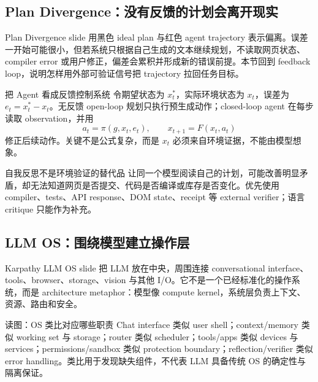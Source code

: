 \subsection{Plan Divergence：没有反馈的计划会离开现实}

Plan Divergence slide 用黑色 ideal plan 与红色 agent trajectory 表示偏离。误差一开始可能很小，但若系统只根据自己生成的文本继续规划，不读取网页状态、compiler error 或用户修正，偏差会累积并形成新的错误前提。本节回到 feedback loop，说明怎样用外部可验证信号把 trajectory 拉回任务目标。


\begin{importantbox}{把 Agent 看成反馈控制系统}
令期望状态为 $x_t^*$，实际环境状态为 $x_t$，误差为 $e_t=x_t^*-x_t$。无反馈 open-loop 规划只执行预生成动作；closed-loop agent 在每步读取 observation，并用
\[
a_t=\pi(g,x_t,e_t),\qquad x_{t+1}=F(x_t,a_t)
\]
修正后续动作。关键不是公式复杂，而是 $x_t$ 必须来自环境证据，不能由模型想象。
\end{importantbox}

\begin{warningbox}{自我反思不是环境验证的替代品}
让同一个模型阅读自己的计划，可能改善明显矛盾，却无法知道网页是否提交、代码是否编译或库存是否变化。优先使用 compiler、tests、API response、DOM state、receipt 等 external verifier；语言 critique 只能作为补充。
\end{warningbox}


\subsection{LLM OS：围绕模型建立操作层}

Karpathy LLM OS slide 把 LLM 放在中央，周围连接 conversational interface、tools、browser、storage、vision 与其他 I/O。它不是一个已经标准化的操作系统，而是 architecture metaphor：模型像 compute kernel，系统层负责上下文、资源、路由和安全。


\begin{knowledgebox}{读图：OS 类比对应哪些职责}
Chat interface 类似 user shell；context/memory 类似 working set 与 storage；router 类似 scheduler；tools/apps 类似 devices 与 services；permissions/sandbox 类似 protection boundary；reflection/verifier 类似 error handling。类比用于发现缺失组件，不代表 LLM 具备传统 OS 的确定性与隔离保证。
\end{knowledgebox}

